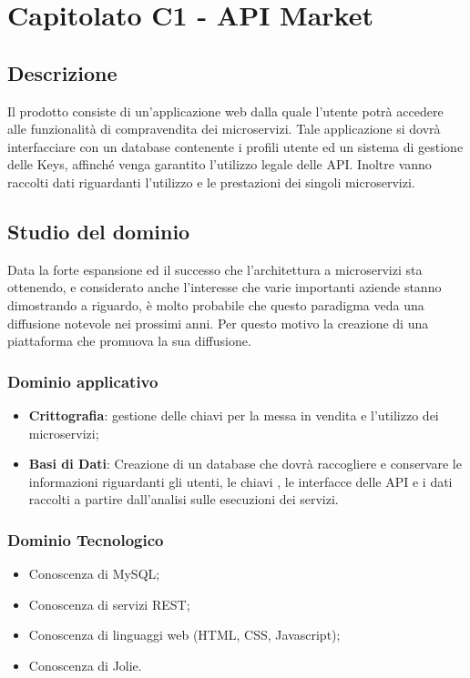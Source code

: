 \documentclass[12pt,a4paper,titlepage]{article}
\begin{document}
	\newpage
	
	\section{Capitolato C1 - API Market}
	\subsection{Descrizione}
	Il prodotto consiste di un'applicazione web dalla quale l'utente potrà accedere alle funzionalità di compravendita dei microservizi. Tale applicazione si dovrà interfacciare con un database contenente i profili utente ed un sistema di gestione delle Keys, affinché venga garantito l'utilizzo legale delle API. Inoltre vanno raccolti dati riguardanti l'utilizzo e le prestazioni dei singoli microservizi.
	
	\subsection{Studio del dominio}
	Data la forte espansione ed il successo che l'architettura a microservizi sta ottenendo, e considerato anche l'interesse che varie importanti aziende stanno dimostrando a riguardo, è molto probabile che questo paradigma veda una diffusione notevole nei prossimi anni. Per questo motivo la creazione di una piattaforma che promuova la sua diffusione.
	\subsubsection{Dominio applicativo} %
	\begin{itemize}
		\item \textbf{Crittografia}: gestione delle chiavi per la messa in vendita e l'utilizzo dei microservizi;
		\item \textbf{Basi di Dati}: Creazione di un database che dovrà raccogliere e conservare le informazioni riguardanti gli utenti, le chiavi , le interfacce delle API e i dati raccolti a partire dall'analisi sulle esecuzioni dei servizi.
	\end{itemize}
	\subsubsection{Dominio Tecnologico}
	\begin{itemize}
		\item Conoscenza di MySQL;
		\item Conoscenza di servizi REST;
		\item Conoscenza di linguaggi web (HTML, CSS, Javascript);
		\item Conoscenza di Jolie.
	\end{itemize}
	
\end{document}
